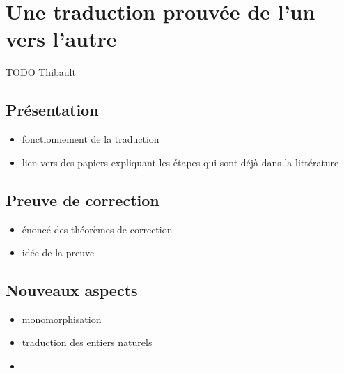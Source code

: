 \section{Une traduction prouvée de l'un vers l'autre}

TODO Thibault


\subsection{Présentation}

\begin{itemize}
\item fonctionnement de la traduction
\item lien vers des papiers expliquant les étapes qui sont déjà dans la
  littérature
\end{itemize}


\subsection{Preuve de correction}

\begin{itemize}
\item énoncé des théorèmes de correction
\item idée de la preuve
\end{itemize}


\subsection{Nouveaux aspects}

\begin{itemize}
\item monomorphisation
\item traduction des entiers naturels
\item 

\end{itemize}
